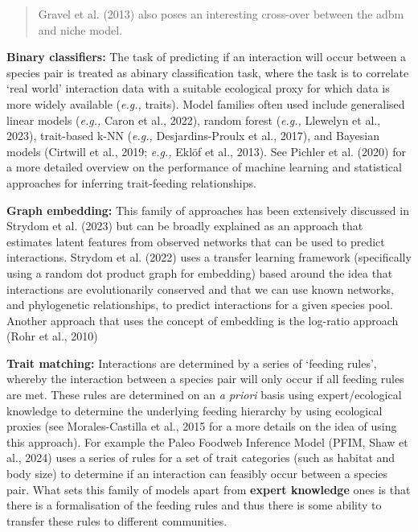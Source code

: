 \documentclass[
]{article}
\begin{document}
\begin{quote}
Gravel et al. (2013) also poses an interesting cross-over between the
adbm and niche model.
\end{quote}

\textbf{Binary classifiers:} The task of predicting if an interaction
will occur between a species pair is treated as abinary classification
task, where the task is to correlate `real world' interaction data with
a suitable ecological proxy for which data is more widely available
(\emph{e.g.,} traits). Model families often used include generalised
linear models (\emph{e.g.,} Caron et al., 2022), random forest
(\emph{e.g.,} Llewelyn et al., 2023), trait-based k-NN (\emph{e.g.,}
Desjardins-Proulx et al., 2017), and Bayesian models (Cirtwill et al.,
2019; \emph{e.g.,} Eklöf et al., 2013). See Pichler et al. (2020) for a
more detailed overview on the performance of machine learning and
statistical approaches for inferring trait-feeding relationships.

\textbf{Graph embedding:} This family of approaches has been extensively
discussed in Strydom et al. (2023) but can be broadly explained as an
approach that estimates latent features from observed networks that can
be used to predict interactions. Strydom et al. (2022) uses a transfer
learning framework (specifically using a random dot product graph for
embedding) based around the idea that interactions are evolutionarily
conserved and that we can use known networks, and phylogenetic
relationships, to predict interactions for a given species pool. Another
approach that uses the concept of embedding is the log-ratio approach
(Rohr et al., 2010)

\textbf{Trait matching:} Interactions are determined by a series of
`feeding rules', whereby the interaction between a species pair will
only occur if all feeding rules are met. These rules are determined on
an \emph{a priori} basis using expert/ecological knowledge to determine
the underlying feeding hierarchy by using ecological proxies (see
Morales-Castilla et al., 2015 for a more details on the idea of using
this approach). For example the Paleo Foodweb Inference Model (PFIM,
Shaw et al., 2024) uses a series of rules for a set of trait categories
(such as habitat and body size) to determine if an interaction can
feasibly occur between a species pair. What sets this family of models
apart from \textbf{expert knowledge} ones is that there is a
formalisation of the feeding rules and thus there is some ability to
transfer these rules to different communities.
\end{document}
